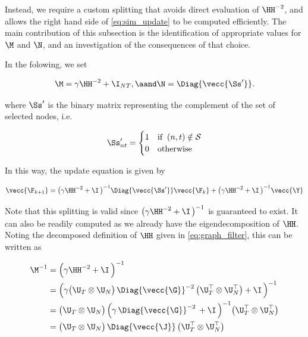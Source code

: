 Instead, we require a custom splitting that avoids direct evaluation of $\HH^{-2}$, and allows the right hand side of \cref{eq:sim_update} to be computed efficiently. The main contribution of this subsection is the identification of appropriate values for $\M$ and $\N$, and an investigation of the consequences of that choice. 

In the folowing, we set 

\begin{equation}
    \M = \gamma \HH^{-2} + \I_{NT}, \aand \N = \Diag{\vecc{\Ss'}}.
\end{equation}

where $\Ss'$ is the binary matrix representing the complement of the set of selected nodes, i.e.

\begin{equation}
    \label{eq:S_}
    \Ss'_{nt} = \begin{cases}
        1 & \text{if} \;\; (n, t) \notin \mathcal{S} \\
        0 & \text{otherwise}
    \end{cases}
\end{equation}

In this way, the update equation is given by 

\begin{equation}
    \label{eq:sim_update2}
    \vecc{\F_{k+1}} = \big(\gamma \HH^{-2} + \I \, \big)^{-1}  \Diag{\vecc{\Ss'}} \vecc{\F_{k}} + \big(\gamma \HH^{-2} + \I \, \big)^{-1} \vecc{\Y}
\end{equation}



Note that this splitting is valid since $\big(\gamma\HH^{-2} + \I \, \big)^{-1}$ is guaranteed to exist. It can also be readily computed as we already have the eigendecomposition of $\HH$. Noting the decomposed definition of $\HH$ given in \cref{eq:graph_filter}, this can be written as

\begin{align}
    \label{eq:inv}
    \M^{-1} & = \Big( \gamma \HH^{-2} + \I \, \Big)^{-1} \notag \\
            & = \Big( \gamma \big(\U_T \otimes \U_N\big)\, \Diag{\vecc{\G}}^{-2}\,  \big(\U_T^\top \otimes \U_N^\top\big)  + \I \, \Big)^{-1} \notag   \\
            & = \big(\U_T \otimes \U_N\big)\, \Big( \gamma \, \Diag{\vecc{\G}}^{-2}\,    + \I \, \Big)^{-1} \big(\U_T^\top \otimes \U_N^\top\big) \notag \\
            & = \big(\U_T \otimes \U_N\big)\, \Diag{\vecc{\J}}\,  \big(\U_T^\top \otimes \U_N^\top\big)
\end{align}

